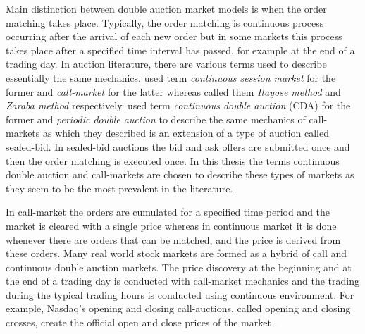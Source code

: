 
Main distinction between double auction market models is when
the order matching takes place. Typically, the order matching 
is continuous process occurring after the arrival of each new order but
in some markets this process takes place after a specified time interval
has passed, for example at the end of a trading day. \citep{boer05}
In auction literature, there are various terms used to describe essentially 
the same mechanics. \citet{boer05} used term 
\textit{continuous session market} for the former and \textit{call-market}
for the latter whereas \citet{ASt05} called them \textit{Itayose method}
and \textit{Zaraba method} respectively. \citet{Moc15} used term \textit{continuous 
double auction} (CDA) for the former and \textit{periodic double auction} to describe 
the same mechanics of call-markets as which they described is an extension of 
a type of auction called sealed-bid. In sealed-bid auctions the bid and ask offers
are submitted once and then the order matching is executed once. In this thesis
the terms continuous double auction and call-markets are chosen to describe
these types of markets as they seem to be the most prevalent in the literature.

In call-market the orders are cumulated for a specified time period and the
market is cleared with a single price whereas in continuous market it is done
whenever there are orders that can be matched, and the price is derived from these
orders. \citep{boer05} 
Many real world stock markets are formed as a hybrid of call and continuous
double auction markets. The price discovery at the beginning and at the end of a 
trading day is conducted with call-market mechanics and the trading during the 
typical trading hours is conducted using continuous environment. \citep{NasdaqClosing05}
For example, Nasdaq's opening and closing call-auctions, called opening and closing crosses,
create the official open and close prices of the market \citep{NasdaqCrosses}.  
 
